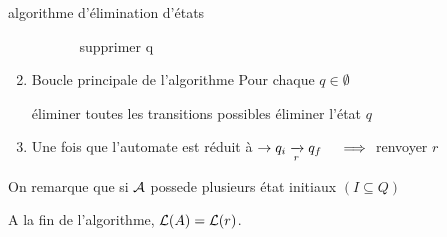 \begin{definition}{algorithme d'élimination d'états}{}
\begin{enumerate}
\begin{enumerate}
\begin{enumerate}
                        \itt supprimer q 
                    \end{enumerate}
                \end{enumerate}
            
            \item Boucle principale de l'algorithme 
                Pour chaque $q \in \emptyset$ 
                \begin{enumerate}
                    \itt éliminer toutes les transitions possibles
                    \itt éliminer l'état $q$
                \end{enumerate}
            \item Une fois que l'automate est réduit à $\to q_i \lima{r}{} q_f \quad \implies$ renvoyer $r$
        \end{enumerate}
    \end{definition}
    
    On remarque que si $\mathcal{A}$ possede plusieurs état initiaux $(I \subseteq Q)$
    
    \begin{theorem}{}{}
        A la fin de l'algorithme, $\mathcal{L}\!\left(A\right) = \mathcal{L}\!\left(r\right)$.
    \end{theorem}
    
